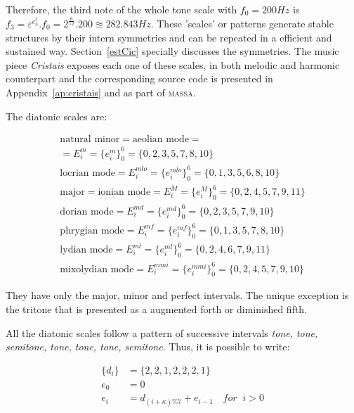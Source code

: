 \documentclass[
 aip,
 jmp,
 amsmath,amssymb,
 reprint,
]{revtex4-1}
\newcommand{\massa}{{\large \textsc{massa}}}
\begin{document}
Therefore, the third note of the whole tone scale with $f_0=200Hz$
is $f_3=\varepsilon^{e_3^t} . f_0 = 2^{\frac{6}{12}} . 200 \approxeq 282.843
Hz$. These 'scales' or patterns generate stable structures by their intern
symmetries and can be repeated in a efficient and sustained way. Section~\ref{estCic} specially discusses the symmetries. 
The music piece \emph{Cristais} exposes each one of these scales, in both melodic and
harmonic counterpart and the corresponding source code is presented in Appendix~\ref{ap:cristais} and as
part of \massa.

The diatonic scales are:

\begin{multline}\label{eq:escalas}
\text{natural minor} = \text{aeolian mode}  = \\ = E_i^m = \{e_i^m\}_0^6 = \{0,2,3,5,7,8,10\} \\
\text{locrian mode}  = E_i^{mlo} = \{e_i^{mlo}\}_0^6 = \{0,1,3,5,6,8,10\} \\ 
\text{major}  = \text{ionian mode}  =  E_i^M = \{e_i^M\}_0^6 = \{0,2,4,5,7,9,11\} \\
\text{dorian mode}  = E_i^{md} = \{e_i^{md}\}_0^6 = \{0,2,3,5,7,9,10\} \\
\text{phrygian mode}  = E_i^{mf} = \{e_i^{mf}\}_0^6 = \{0,1,3,5,7,8,10\} \\
\text{lydian mode}  = E_i^{ml}=\{e_i^{ml}\}_0^6 = \{0,2,4,6,7,9,11\} \\
\text{mixolydian mode} = E_i^{mmi} = \{e_i^{mmi}\}_0^6 = \{0,2,4,5,7,9,10\}
\end{multline}

\noindent They have only the major, minor and perfect intervals. The unique exception is the tritone that is presented as a augmented forth or diminished fifth.

All the diatonic scales follow a pattern of successive intervals \textit{tone,
tone, semitone, tone, tone, tone, semitone}. Thus, it is possible to write:

\begin{equation}\label{eq:relacaoDia}
\begin{split}
\{d_i\} & =\{2,2,1,2,2,2,1\} \\
e_0 & =0 \\
e_i & =d_{(i+\kappa)\%7}+e_{i-1} \quad for \;\;  i > 0
\end{split}
\end{equation}
\end{document}
